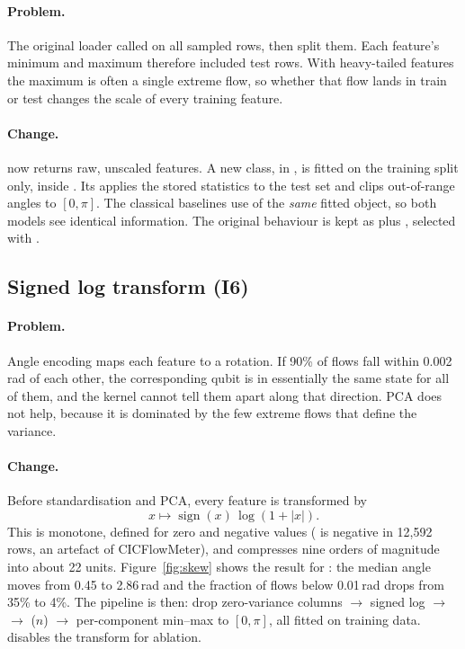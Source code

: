 \paragraph{Problem.} The original loader called  on all
sampled rows, then  split them. Each feature's minimum and maximum therefore
included test rows. With heavy-tailed features the maximum is often a single extreme flow, so
whether that flow lands in train or test changes the scale of every training feature.

\paragraph{Change.}  now returns raw, unscaled features. A new class,
 in , is fitted on the training split only, inside
. Its  applies the stored statistics to the test set and clips
out-of-range angles to $[0,\pi]$. The classical baselines use  of the
\emph{same} fitted object, so both models see identical information. The original behaviour is
kept as  plus , selected with
.

\subsection{Signed log transform (I6)}
\paragraph{Problem.} Angle encoding maps each feature to a rotation. If 90\% of flows fall within
0.002\,rad of each other, the corresponding qubit is in essentially the same state for all of
them, and the kernel cannot tell them apart along that direction. PCA does not help, because it
is dominated by the few extreme flows that define the variance.

\paragraph{Change.} Before standardisation and PCA, every feature is transformed by
\begin{equation}
x\mapsto \operatorname{sign}(x)\,\log(1+|x|).
\end{equation}
This is monotone, defined for zero and negative values ( is negative in
12{,}592 rows, an artefact of CICFlowMeter), and compresses nine orders of magnitude into about 22 units.
Figure~\ref{fig:skew} shows the result for : the median angle moves from
0.45 to 2.86\,rad and the fraction of flows below 0.01\,rad drops from 35\% to 4\%. The pipeline
is then: drop zero-variance columns $\to$ signed log $\to$  $\to$
($n$) $\to$ per-component min--max to $[0,\pi]$, all fitted on training data.
 disables the transform for ablation.


